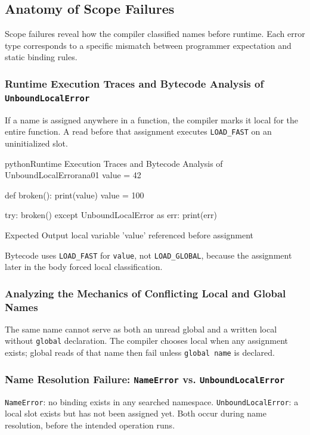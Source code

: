 \subsection{Anatomy of Scope Failures}

Scope failures reveal how the compiler classified names before runtime. Each error type corresponds to a specific mismatch between programmer expectation and static binding rules.

\subsubsection{Runtime Execution Traces and Bytecode Analysis of \texttt{UnboundLocalError}}

If a name is assigned anywhere in a function, the compiler marks it local for the entire function. A read before that assignment executes \texttt{LOAD\_FAST} on an uninitialized slot.

\begin{codebox}[]{python}{Runtime Execution Traces and Bytecode Analysis of UnboundLocalError}{ana01}
value = 42

def broken():
    print(value)
    value = 100

try:
    broken()
except UnboundLocalError as err:
    print(err)
\end{codebox}


\begin{iobox}{Expected Output}
local variable 'value' referenced before assignment \\
\end{iobox}




Bytecode uses \texttt{LOAD\_FAST} for \texttt{value}, not \texttt{LOAD\_GLOBAL}, because the assignment later in the body forced local classification.

\subsubsection{Analyzing the Mechanics of Conflicting Local and Global Names}

The same name cannot serve as both an unread global and a written local without \texttt{global} declaration. The compiler chooses local when any assignment exists; global reads of that name then fail unless \texttt{global name} is declared.

\subsubsection{Name Resolution Failure: \texttt{NameError} vs. \texttt{UnboundLocalError}}

\texttt{NameError}: no binding exists in any searched namespace. \texttt{UnboundLocalError}: a local slot exists but has not been assigned yet. Both occur during name resolution, before the intended operation runs.
